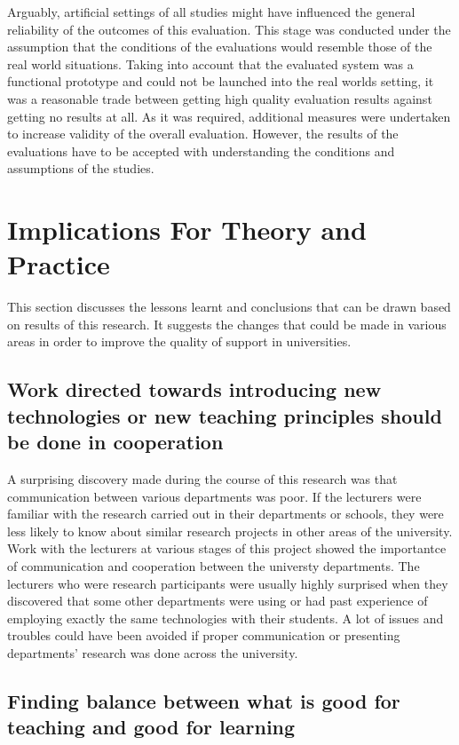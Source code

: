 Arguably, artificial settings of all studies might have influenced the general
reliability of the outcomes of this evaluation. This stage was conducted
under the assumption that the conditions of the evaluations would resemble those
of the real world situations. Taking into account that the evaluated system was
a functional prototype and could not be launched into the real worlds setting,
it was a reasonable trade between getting high quality evaluation results
against getting no results at all. As it was required, additional measures were
undertaken to increase validity of the overall evaluation. However, the results
of the evaluations have to be accepted with understanding the conditions and
assumptions of the studies.

\section{Implications For Theory and Practice}

This section discusses the lessons learnt and conclusions that can be drawn
based on results of this research. It suggests the changes that could be made in
various areas in order to improve the quality of \LLLs support in universities.

\subsection[Cooperation and Communication]{Work directed towards introducing
new technologies or new teaching principles should be done in cooperation}

A surprising discovery made during the course of this research was that
communication between various departments was poor. If the lecturers were
familiar with the research carried out in their departments or schools, they
were less likely to know about similar research projects in other areas of
the university. Work with the lecturers at various stages of this project showed
the importantce of communication and cooperation between the universty
departments. The lecturers who were research participants were usually highly
surprised when they discovered that some other departments were using or had
past experience of employing exactly the same technologies with their students.
A lot of issues and troubles could have been avoided if proper communication or
presenting departments' research was done across the university.

\subsection[Finding Balance]{Finding balance between what is good for teaching
and good for learning}

